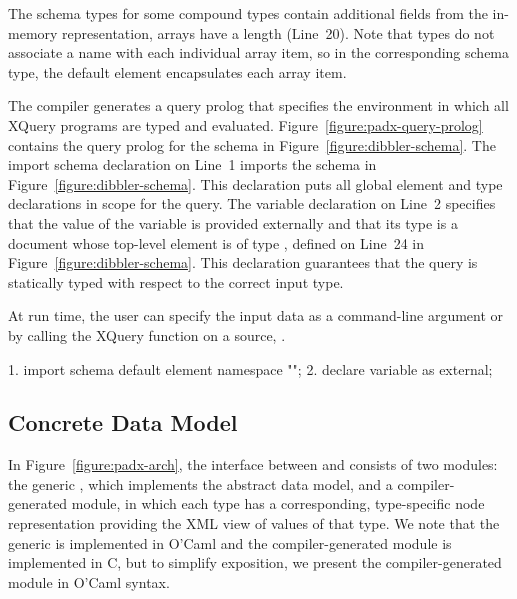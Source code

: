 The schema types for some compound types contain additional fields
from the \pads{} in-memory representation, \eg{} arrays have a length
(Line~20).  Note that  types do not associate a name with
each individual array item, so in the corresponding schema type, the
default element  encapsulates each array item.

The \pads{} compiler generates a query prolog that specifies the
environment in which all XQuery programs are typed and evaluated. 
Figure~\ref{figure:padx-query-prolog} contains the query prolog for
the schema in Figure~\ref{figure:dibbler-schema}.  The import schema
declaration on Line~1 imports the schema in
Figure~\ref{figure:dibbler-schema}.  This declaration puts all global
element and type declarations in scope for the query.  The variable
declaration on Line~2 specifies that the value of the variable
 is provided externally and that its type is a document
whose top-level element is of type , defined on Line~24 in
Figure~\ref{figure:dibbler-schema}.  This declaration guarantees
that the query is statically typed with respect to the correct input type.

At run time, the user can specify
the input data as a command-line argument or by calling the XQuery
 function on a \pads{} source, \eg{} .
\begin{figure*}
\begin{small}
\begin{code}
 1. import schema default element namespace "";
 2. declare variable  as  external; 
\end{code}
\end{small}
\caption{\padx{} generated query prolog}
\label{figure:padx-query-prolog}
\end{figure*}

\subsection{\padx{} Concrete Data Model}

In Figure~\ref{figure:padx-arch}, the interface between \Galax{} and
\pads{} consists of two modules: the generic \padx{} \condm{},
which implements the \Galax{} abstract data model, and a
compiler-generated module, in which each \pads{} type has a
corresponding, type-specific node representation providing the XML
view of values of that type.  We note that the generic \condm{} is
implemented in O'Caml and the compiler-generated module is implemented
in C, but to simplify exposition, we present the compiler-generated
module in O'Caml syntax. 

